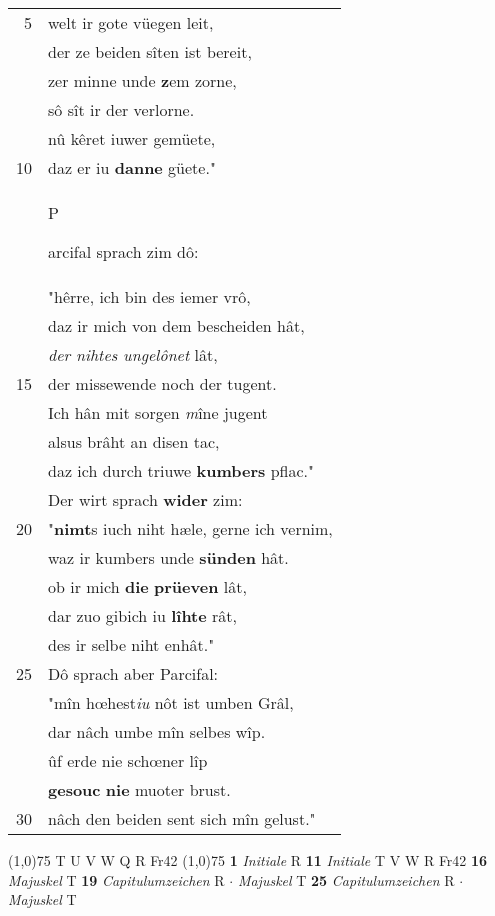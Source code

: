 \documentclass[8pt,a4paper,notitlepage]{article}
\begin{document}
\begin{table}[ht]
\begin{minipage}[t]{0.5\linewidth}
\begin{tabular}{rl}
5 & welt ir gote vüegen leit,\\ 
 & der ze beiden sîten ist bereit,\\ 
 & zer minne unde \textbf{z}em zorne,\\ 
 & sô sît ir der verlorne.\\ 
 & nû kêret iuwer gemüete,\\ 
10 & daz er iu \textbf{danne} güete."\\ 
 & \begin{large}P\end{large}arcifal sprach zim dô:\\ 
 & "hêrre, ich bin des iemer vrô,\\ 
 & daz ir mich von dem bescheiden hât,\\ 
 & \textit{der nihtes ungelônet} lât,\\ 
15 & der missewende noch der tugent.\\ 
 & Ich hân mit sorgen \textit{m}îne jugent\\ 
 & alsus brâht an disen tac,\\ 
 & daz ich durch triuwe \textbf{kumbers} pflac."\\ 
 & Der wirt sprach \textbf{wider} zim:\\ 
20 & "\textbf{nimt}s iuch niht hæle, gerne ich vernim,\\ 
 & waz ir kumbers unde \textbf{sünden} hât.\\ 
 & ob ir mich \textbf{die} \textbf{prüeven} lât,\\ 
 & dar zuo gibich iu \textbf{lîhte} rât,\\ 
 & des ir selbe niht enhât."\\ 
25 & Dô sprach aber Parcifal:\\ 
 & "mîn hœhest\textit{iu} nôt ist umben Grâl,\\ 
 & dar nâch umbe mîn selbes wîp.\\ 
 & ûf erde nie schœner lîp\\ 
 & \textbf{gesouc} \textbf{nie} muoter brust.\\ 
30 & nâch den beiden sent sich mîn gelust."\\ 
\end{tabular}
\scriptsize
\line(1,0){75} \newline
T U V W Q R Fr42 \newline
\line(1,0){75} \newline
\textbf{1} \textit{Initiale} R  \textbf{11} \textit{Initiale} T V W R Fr42  \textbf{16} \textit{Majuskel} T  \textbf{19} \textit{Capitulumzeichen} R   $\cdot$ \textit{Majuskel} T  \textbf{25} \textit{Capitulumzeichen} R   $\cdot$ \textit{Majuskel} T  \newline

\end{minipage}
\end{table}
\end{document}
